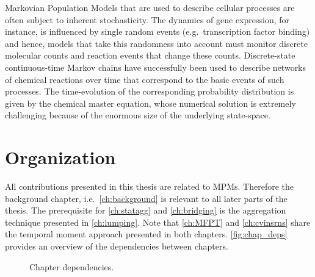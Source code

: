 
Markovian Population Models that are used to describe cellular processes are often subject to inherent stochasticity.
The dynamics of gene expression, for instance, is influenced by 
single random events (e.g.\ transcription factor binding) and 
hence, models that take this randomness into account must monitor
discrete molecular counts and reaction events that change these counts.
Discrete-state continuous-time Markov chains have successfully  been
used to describe  networks of chemical reactions
over time that correspond to the basic events of such processes. 
The time-evolution of the corresponding probability distribution is 
given by the chemical master equation, whose numerical solution is
extremely challenging because of the enormous size of the underlying
state-space. 

\section{Organization}
All contributions presented in this thesis are related to \aclp{MPM}.
Therefore the background chapter, i.e.\ \autoref{ch:background} is relevant
to all later parts of the thesis.
The prerequisite for \autoref{ch:statagg} and \autoref{ch:bridging} is the aggregation
technique presented in \autoref{ch:lumping}.
Note that \autoref{ch:MFPT} and \autoref{ch:cvinsrns} share the temporal moment approach presented
in both chapters.
\autoref{fig:chap_deps} provides an overview of the dependencies between chapters.
\begin{figure}[htb]
	\centering
{}
	\caption{\label{fig:chap_deps}Chapter dependencies.}
\end{figure}


